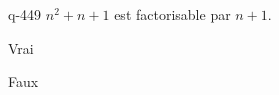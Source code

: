 \begin{truefalse}{q-449}
$n^2+n+1$ est factorisable par $n+1$.
\item Vrai
\item* Faux
\end{truefalse}

